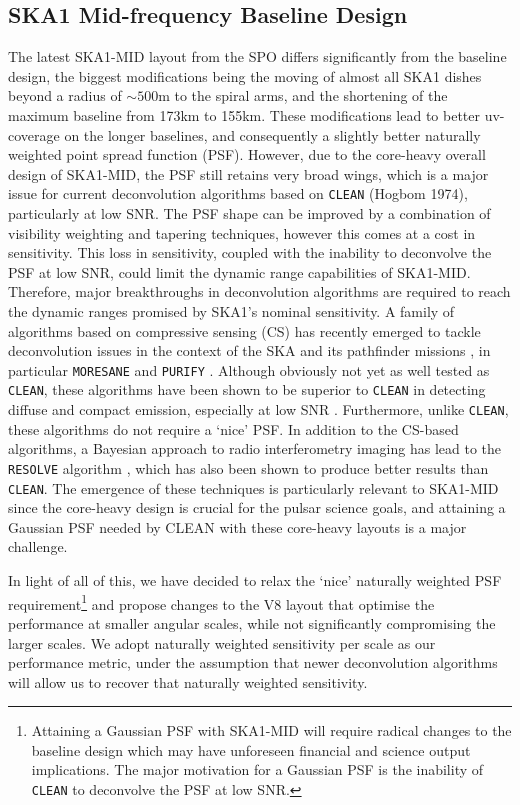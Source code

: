 \documentclass[sfheadings,a4paper,times,9pt,floats,floatfix]{article}
\begin{document}
\subsection{SKA1 Mid-frequency Baseline Design}\label{sec:BL}
The latest SKA1-MID layout from the SPO differs significantly from the
baseline design, the biggest modifications being the moving of almost all
SKA1 dishes beyond a radius of $\sim500$m to the spiral arms, and the
shortening of the maximum baseline from 173km to 155km. These modifications lead to better uv-coverage on
the longer baselines, and consequently a slightly better naturally weighted point spread function (PSF).
However, due to the core-heavy overall design of SKA1-MID, the PSF still retains very broad wings, which is a major issue for current
deconvolution algorithms based on {\tt CLEAN} (Hogbom 1974),
particularly at low SNR. The PSF shape can be improved by a
combination of visibility weighting and tapering techniques, however
this comes at a cost in sensitivity. This loss in sensitivity, coupled
with the inability to deconvolve the PSF at low SNR, could limit the dynamic
range capabilities of SKA1-MID. Therefore, major breakthroughs in
deconvolution algorithms are required to reach the dynamic ranges
promised by SKA1's nominal sensitivity. A family of algorithms based
on compressive sensing (CS) has recently emerged to tackle
deconvolution issues in the context of the SKA and its pathfinder
missions \cite{cs-ska}, in particular {\tt MORESANE} \cite{mrs1,mrs2} and {\tt PURIFY} \cite{purify}.
Although obviously not yet as well tested as {\tt CLEAN}, these algorithms
have been shown to be superior to {\tt CLEAN} in detecting diffuse and
compact emission, especially at low SNR \cite{ferrari}. Furthermore,
unlike {\tt CLEAN}, these algorithms do not
require a `nice' PSF. In addition to the CS-based algorithms, a
Bayesian approach to radio interferometry imaging has lead to the {\tt
RESOLVE} algorithm \cite{resolve}, which has also been shown to produce better
results than {\tt CLEAN}. The emergence of these techniques is
particularly relevant to
SKA1-MID since the core-heavy design is crucial for the pulsar science
goals, and attaining a Gaussian PSF needed by CLEAN with these
core-heavy layouts is a major challenge.

In light of all of this, we have decided to relax the `nice' naturally
weighted PSF requirement\footnote{Attaining a Gaussian PSF with
SKA1-MID will require radical changes to the baseline design which may
have unforeseen financial and science output implications. The major
motivation for a Gaussian PSF is the inability of {\tt CLEAN} to
deconvolve the PSF at low SNR.} and propose changes to the V8 layout
that optimise the performance at smaller angular scales, while not
significantly compromising the larger scales. We adopt naturally
weighted sensitivity per scale as our performance metric, under the
assumption that newer deconvolution algorithms will allow us to
recover that naturally weighted sensitivity.
\end{document}
